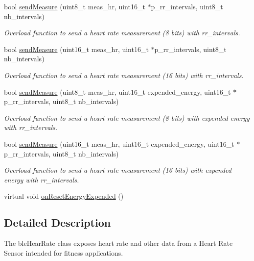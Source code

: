 \begin{DoxyCompactItemize}
bool \hyperlink{classble_heart_rate_ab511f6fcb6b7b57c09132911b5f87cb7}{send\-Measure} (uint8\-\_\-t meas\-\_\-hr, uint16\-\_\-t $\ast$p\-\_\-rr\-\_\-intervals, uint8\-\_\-t nb\-\_\-intervals)
\begin{DoxyCompactList}\small\item\em Overload function to send a heart rate measurement (8 bits) with rr\-\_\-intervals. \end{DoxyCompactList}\item 
bool \hyperlink{classble_heart_rate_a1d3fd3348703d304cd445620e7bb4998}{send\-Measure} (uint16\-\_\-t meas\-\_\-hr, uint16\-\_\-t $\ast$p\-\_\-rr\-\_\-intervals, uint8\-\_\-t nb\-\_\-intervals)
\begin{DoxyCompactList}\small\item\em Overload function to send a heart rate measurement (16 bits) with rr\-\_\-intervals. \end{DoxyCompactList}\item 
bool \hyperlink{classble_heart_rate_a2a6d1f10ea9a92ad5a953fc683125c50}{send\-Measure} (uint8\-\_\-t meas\-\_\-hr, uint16\-\_\-t expended\-\_\-energy, uint16\-\_\-t $\ast$p\-\_\-rr\-\_\-intervals, uint8\-\_\-t nb\-\_\-intervals)
\begin{DoxyCompactList}\small\item\em Overload function to send a heart rate measurement (8 bits) with expended energy with rr\-\_\-intervals. \end{DoxyCompactList}\item 
bool \hyperlink{classble_heart_rate_ab5cf3fd6c2e5909af4d51150c865d8b0}{send\-Measure} (uint16\-\_\-t meas\-\_\-hr, uint16\-\_\-t expended\-\_\-energy, uint16\-\_\-t $\ast$p\-\_\-rr\-\_\-intervals, uint8\-\_\-t nb\-\_\-intervals)
\begin{DoxyCompactList}\small\item\em Overload function to send a heart rate measurement (16 bits) with expended energy with rr\-\_\-intervals. \end{DoxyCompactList}\item 
virtual void \hyperlink{classble_heart_rate_a4764687c0e158518141b3dba9103b5d2}{on\-Reset\-Energy\-Expended} ()
\end{DoxyCompactItemize}


\subsection{Detailed Description}
The ble\-Hear\-Rate class exposes heart rate and other data from a Heart Rate Sensor intended for fitness applications. 

